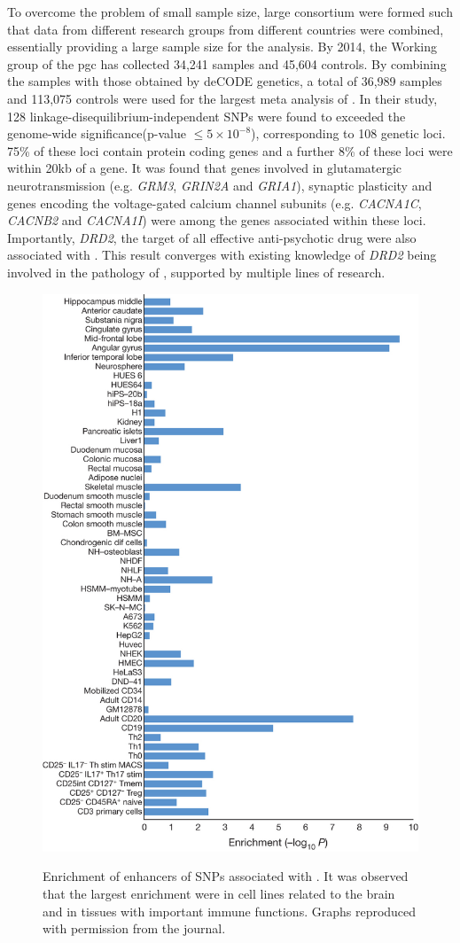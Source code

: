 \documentclass[12pt]{book}
\newcommand*{\glng}{\glsentrylong}
\newcommand*{\Glng}{\Glsentrylong}
\begin{document}
	To overcome the problem of small sample size, large consortium were formed such that data from different research groups from different countries were combined, essentially providing a large sample size for the analysis.
	By 2014, the \Glng{scz} Working group of the \gls{pgc} has collected 34,241 \glng{scz} samples and 45,604 controls\citep{Ripke2014}.
	By combining the samples with those obtained by deCODE genetics, a total of 36,989 \glng{scz} samples and 113,075 controls were used for the largest meta analysis of \glng{scz}.
	In their study\citep{Ripke2014}, 128 linkage-disequilibrium-independent \glspl{SNP} were found to  exceeded the genome-wide significance(p-value $\le 5\times10^{-8}$), corresponding to 108 genetic loci.
	75\% of these loci contain protein coding genes and a further 8\% of these loci were within 20kb of a gene. 
	It was found that genes involved in glutamatergic neurotransmission (e.g. \textit{GRM3}, \textit{GRIN2A} and \textit{GRIA1}), synaptic plasticity and genes encoding the voltage-gated calcium channel subunits (e.g. \textit{CACNA1C}, \textit{CACNB2} and \textit{CACNA1I}) were among the genes associated within these loci.
	Importantly, \textit{DRD2}, the target of all effective anti-psychotic drug were also associated with \glng{scz}.
	This result converges with existing knowledge of \textit{DRD2} being involved in the pathology of \glng{scz}, supported by multiple lines of research\citep{Talkowski2007}.
	\begin{figure}
		\centering
		\caption[Enrichment of enhancers of SNPs associated with Schizophrenia]{Enrichment of enhancers of SNPs associated with \glng{scz}. 
			It was observed that the largest enrichment were in cell lines related to the brain and in tissues with important immune functions. 
			Graphs reproduced with permission from the journal.\citep{Ripke2014}}
		\includegraphics[height=\textwidth]{figure/pgc_enrichment_tissue.jpg}
		\label{fig:pgcEnrich}
	\end{figure}
\end{document}
